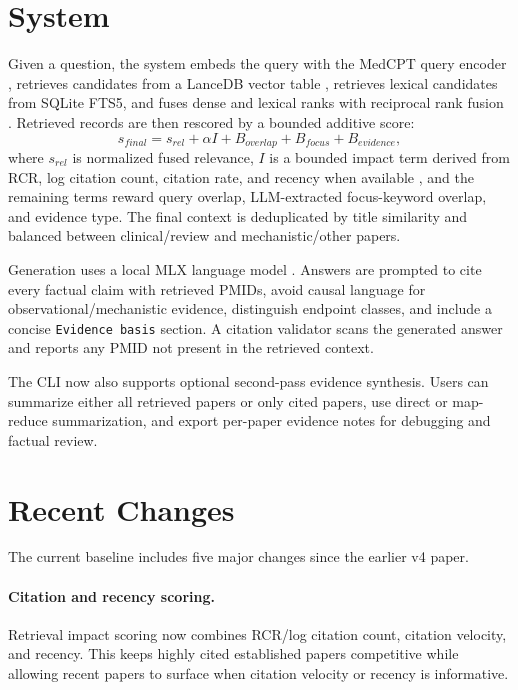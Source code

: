 \documentclass{article}
\begin{document}
\section{System}

Given a question, the system embeds the query with the MedCPT query encoder \citep{jin2023medcpt}, retrieves candidates from a LanceDB vector table \citep{lancedb}, retrieves lexical candidates from SQLite FTS5, and fuses dense and lexical ranks with reciprocal rank fusion \citep{rrf}. Retrieved records are then rescored by a bounded additive score:
\begin{equation}
  s_{final} = s_{rel} + \alpha I + B_{overlap} + B_{focus} + B_{evidence},
\end{equation}
where $s_{rel}$ is normalized fused relevance, $I$ is a bounded impact term derived from RCR, log citation count, citation rate, and recency when available \citep{icite}, and the remaining terms reward query overlap, LLM-extracted focus-keyword overlap, and evidence type. The final context is deduplicated by title similarity and balanced between clinical/review and mechanistic/other papers.

Generation uses a local MLX language model \citep{mlx}. Answers are prompted to cite every factual claim with retrieved PMIDs, avoid causal language for observational/mechanistic evidence, distinguish endpoint classes, and include a concise \texttt{Evidence basis} section. A citation validator scans the generated answer and reports any PMID not present in the retrieved context.

The CLI now also supports optional second-pass evidence synthesis. Users can summarize either all retrieved papers or only cited papers, use direct or map-reduce summarization, and export per-paper evidence notes for debugging and factual review.

\section{Recent Changes}

The current baseline includes five major changes since the earlier v4 paper.

\paragraph{Citation and recency scoring.} Retrieval impact scoring now combines RCR/log citation count, citation velocity, and recency. This keeps highly cited established papers competitive while allowing recent papers to surface when citation velocity or recency is informative.
\end{document}
